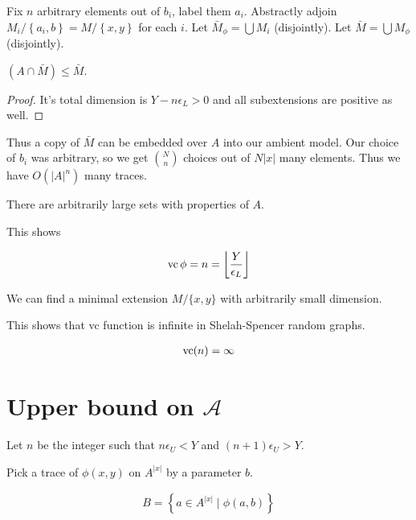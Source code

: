 \documentclass{amsart}
\renewcommand{\AA}{\mathscr A}
\newcommand{\curly}[1]{\left\{#1\right\}}
\providecommand{\floor}[1]{\left \lfloor #1 \right \rfloor }
\begin{document}
Fix $n$ arbitrary elements out of $b_i$, label them $a_i$.
Abstractly adjoin $M_i/\curly{a_i, b} = M/\curly{x,y}$ for each $i$.
Let $\bar M_\phi = \bigcup M_i$ (disjointly).
Let $\bar M = \bigcup M_\phi$ (disjointly).

\begin{Claim}
	$(A \cap \bar M) \leq \bar M$.
\end{Claim}
\begin{proof}
	It's total dimension is $Y - n\epsilon_L > 0$ and all subextensions are positive as well.
\end{proof}

Thus a copy of $\bar M$ can be embedded over $A$ into our ambient model.
Our choice of $b_i$ was arbitrary, so we get ${N \choose n}$ choices out of $N|x|$ many elements.
Thus we have $O(|A|^n)$ many traces.

\begin{Lemma}
	There are arbitrarily large sets with properties of $A$.
\end{Lemma}

This shows

\begin{align*}
	\vc \phi = n = \floor{\frac{Y}{\epsilon_L}}
\end{align*}

\begin{Claim}
	We can find a minimal extension $M / \{x, y\}$ with arbitrarily small dimension.
\end{Claim}

This shows that vc function is infinite in Shelah-Spencer random graphs.

\begin{align*}
	\operatorname{vc}(n) = \infty
\end{align*}

\section{Upper bound on $\AA$}

Let $n$ be the integer such that $n \epsilon_U < Y$ and $(n+1) \epsilon_U > Y$.

Pick a trace of $\phi(x,y)$ on $A^{|x|}$ by a parameter $b$.

\begin{align*}
	B = \curly{a \in A^{|x|} \mid \phi(a, b)}
\end{align*}
\end{document}
